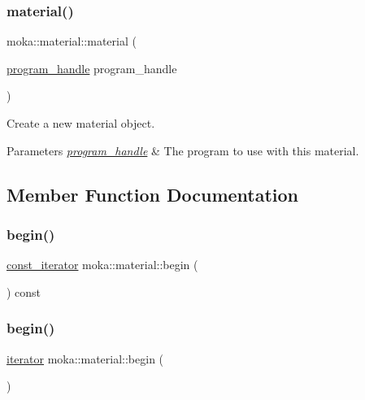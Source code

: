 \subsubsection{\texorpdfstring{material()}{material()}\hspace{0.1cm}{\footnotesize\ttfamily [5/5]}}
{\footnotesize\ttfamily moka\+::material\+::material (\begin{DoxyParamCaption}\item[{\mbox{\hyperlink{structmoka_1_1program__handle}{program\+\_\+handle}}}]{program\+\_\+handle }\end{DoxyParamCaption})\hspace{0.3cm}{\ttfamily [explicit]}}



Create a new material object. 


\begin{DoxyParams}{Parameters}
{\em \mbox{\hyperlink{structmoka_1_1program__handle}{program\+\_\+handle}}} & The program to use with this material. \\
\hline
\end{DoxyParams}


\subsection{Member Function Documentation}
\mbox{\label{classmoka_1_1material_a24c56dd5ee751869a0a89c4ee86df6ad}} 
\subsubsection{\texorpdfstring{begin()}{begin()}\hspace{0.1cm}{\footnotesize\ttfamily [1/2]}}
{\footnotesize\ttfamily \mbox{\hyperlink{classmoka_1_1material_ab87ba893c5a7741e95718b0bddbc1049}{const\+\_\+iterator}} moka\+::material\+::begin (\begin{DoxyParamCaption}{ }\end{DoxyParamCaption}) const}

\mbox{\label{classmoka_1_1material_a37b3e0f903ed7e55497d5797c52d7f36}} 
\subsubsection{\texorpdfstring{begin()}{begin()}\hspace{0.1cm}{\footnotesize\ttfamily [2/2]}}
{\footnotesize\ttfamily \mbox{\hyperlink{classmoka_1_1material_ac6839c8e1a338dbaef539569388f89e5}{iterator}} moka\+::material\+::begin (\begin{DoxyParamCaption}{ }\end{DoxyParamCaption})}

